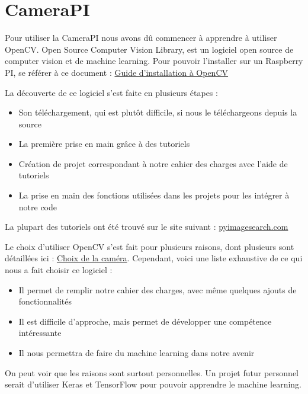 \documentclass[
	a4paper,									%
	11pt,										%
	twoside,									%
	openright,									%
	notitlepage,									%
	parskip=half,								%
]{scrreprt}										%
\begin{document}
\section{CameraPI}

Pour utiliser la CameraPI nous avons dû commencer à apprendre à utiliser OpenCV. 
Open Source Computer Vision Library, est un logiciel open source de computer vision et de machine learning. 
Pour pouvoir l'installer sur un Raspberry PI, se référer à ce document : \href{run:./Installation_OpenCV.pdf}{Guide d'installation à OpenCV}\par

La découverte de ce logiciel s'est faite en plusieurs étapes : 

\begin{itemize}
	\item Son téléchargement, qui est plutôt difficile, si nous le téléchargeons depuis la source
	\item La première prise en main grâce à des tutoriels
	\item Création de projet correspondant à notre cahier des charges avec l'aide de tutoriels
	\item La prise en main des fonctions utilisées dans les projets pour les intégrer à notre code
\end{itemize}

La plupart des tutoriels ont été trouvé sur le site suivant : \href{https://pyimagesearch.com/}{pyimagesearch.com} \par

Le choix d'utiliser OpenCV s'est fait pour plusieurs raisons, dont plusieurs sont détaillées ici : \href{run:./Choix_Camera.pdf}{Choix de la caméra}. 
Cependant, voici une liste exhaustive de ce qui nous a fait choisir ce logiciel :

\begin{itemize}
	\item Il permet de remplir notre cahier des charges, avec même quelques ajouts de fonctionnalités
	\item Il est difficile d'approche, mais permet de développer une compétence intéressante
	\item Il nous permettra de faire du machine learning dans notre avenir
\end{itemize}

On peut voir que les raisons sont surtout personnelles. Un projet futur personnel serait d'utiliser Keras et TensorFlow
pour pouvoir apprendre le machine learning. \par
\end{document}
